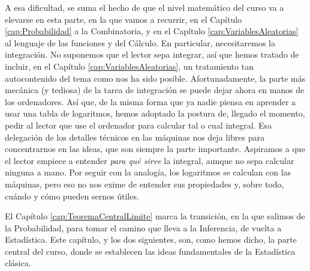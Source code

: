 A esa dificultad, se suma el hecho de que el nivel matemático del curso va a elevarse en esta
parte, en la que vamos a recurrir, en el Capítulo \ref{cap:Probabilidad} a la Combinatoria, y en el
Capítulo \ref{cap:VariablesAleatorias} al lenguaje de las funciones y del Cálculo. En particular,
necesitaremos la integración. No suponemos que el lector sepa integrar, así que hemos tratado de
incluir, en el Capítulo \ref{cap:VariablesAleatorias}, un tratamiento tan autocontenido del tema
como nos ha sido posible. Afortunadamente, la parte más mecánica (y tediosa) de la tarea de integración se
puede dejar ahora en manos de los ordenadores. Así que, de la misma forma que ya
nadie piensa en aprender a usar una tabla de logaritmos, hemos adoptado la postura de, llegado el
momento, pedir al lector que use el ordenador para calcular tal o cual integral. Esa delegación de los detalles técnicos en las máquinas nos deja libres para concentrarnos en las ideas, que son siempre la parte importante. Aspiramos a que el lector empiece a entender {\em para qué sirve} la integral, aunque no sepa calcular ninguna a mano. Por seguir con la analogía, los logaritmos se calculan con las máquinas, pero eso no nos exime de entender sus propiedades y, sobre todo, cuándo y cómo pueden sernos útiles.

El Capítulo \ref{cap:TeoremaCentralLimite} marca la transición, en la que salimos de la
Probabilidad, para tomar el camino que lleva a la Inferencia, de vuelta a Estadística. Este
capítulo, y los dos siguientes, son, como hemos dicho, la parte central del curso, donde se
establecen las ideas fundamentales de la Estadística clásica.
